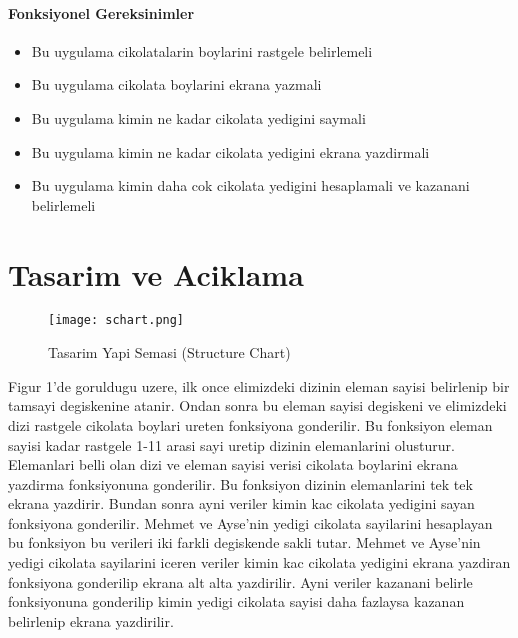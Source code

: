 \documentclass{article}
\begin{document}
	\paragraph{Fonksiyonel Gereksinimler}
	\begin{itemize}
		\item Bu uygulama cikolatalarin boylarini rastgele belirlemeli
		
		\item Bu uygulama cikolata boylarini ekrana yazmali
		
		\item Bu uygulama kimin ne kadar cikolata yedigini saymali
		
		\item Bu uygulama kimin ne kadar cikolata yedigini ekrana yazdirmali
		
		\item Bu uygulama kimin daha cok cikolata yedigini hesaplamali ve kazanani belirlemeli
	\end{itemize}

	\newpage
	
	\section{Tasarim ve Aciklama}
		\begin{figure}
			\texttt{[image: schart.png]}
			\caption{Tasarim Yapi Semasi (Structure Chart)}
			\label{fig:schart}
		\end{figure}
	Figur 1'de goruldugu uzere, ilk once elimizdeki dizinin eleman sayisi belirlenip bir tamsayi degiskenine atanir. Ondan sonra bu eleman sayisi degiskeni ve elimizdeki dizi rastgele cikolata boylari ureten fonksiyona gonderilir. Bu fonksiyon eleman sayisi kadar rastgele 1-11 arasi sayi uretip dizinin elemanlarini olusturur. Elemanlari belli olan dizi ve eleman sayisi verisi cikolata boylarini ekrana yazdirma fonksiyonuna gonderilir. Bu fonksiyon dizinin elemanlarini tek tek ekrana yazdirir. Bundan sonra ayni veriler kimin kac cikolata yedigini sayan fonksiyona gonderilir. Mehmet ve Ayse'nin yedigi cikolata sayilarini hesaplayan bu fonksiyon bu verileri iki farkli degiskende sakli tutar. Mehmet ve Ayse'nin yedigi cikolata sayilarini iceren veriler kimin kac cikolata yedigini ekrana yazdiran fonksiyona gonderilip ekrana alt alta yazdirilir. Ayni veriler kazanani belirle fonksiyonuna gonderilip kimin yedigi cikolata sayisi daha fazlaysa kazanan belirlenip ekrana yazdirilir. 
	
	\newpage
	
\end{document}
